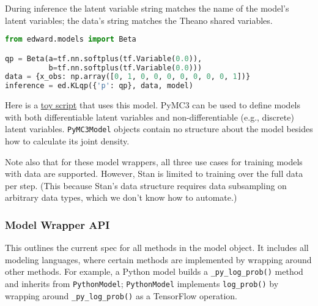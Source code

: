 During inference the latent variable string matches the name of the
model's latent variables; the data's string matches the Theano shared
variables.

\begin{lstlisting}[language=Python]
from edward.models import Beta

qp = Beta(a=tf.nn.softplus(tf.Variable(0.0)),
          b=tf.nn.softplus(tf.Variable(0.0)))
data = {x_obs: np.array([0, 1, 0, 0, 0, 0, 0, 0, 0, 1])}
inference = ed.KLqp({'p': qp}, data, model)
\end{lstlisting}

Here is a
\href{https://github.com/blei-lab/edward/blob/master/examples/pymc3_beta_bernoulli.py}
{toy script}
that uses this model. PyMC3 can be used to define models with both
differentiable latent variables and non-differentiable (e.g., discrete)
latent variables. \texttt{PyMC3Model} objects contain no structure about the
model besides how to calculate its joint density.

Note also that for these model wrappers,
all three use cases for training models with data are supported. However,
Stan is limited to training over the full data per step. (This
because Stan's data structure requires data subsampling on arbitrary
data types, which we don't know how to automate.)

\subsubsection{Model Wrapper API}

This outlines the current spec for all methods in the model object.
It includes all modeling languages, where certain methods are
implemented by wrapping around other methods. For example, a Python
model builds a \texttt{_py_log_prob()} method and inherits from
\texttt{PythonModel}; \texttt{PythonModel} implements \texttt{log_prob()} by wrapping
around \texttt{_py_log_prob()} as a TensorFlow operation.

